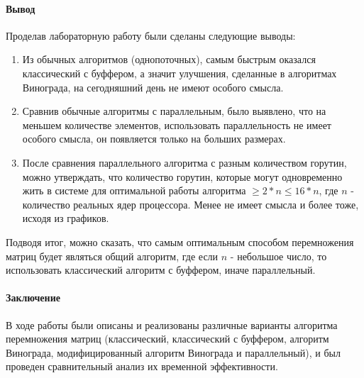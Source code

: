 \documentclass[utf8x, 12pt]{G7-32} %
\begin{document}
\newpage

\paragraph{Вывод}

Проделав лабораторную работу были сделаны следующие выводы:
\begin{enumerate}
	\item Из обычных алгоритмов (однопоточных), самым быстрым оказался классический с буффером, а значит улучшения, сделанные в алгоритмах Винограда, на сегодняшний день не имеют особого смысла.
	\item Сравнив обычные алгоритмы с параллельным, было выявлено, что на меньшем количестве элементов, использовать параллельность не имеет особого смысла, он появляется только на больших размерах.
	\item После сравнения параллельного алгоритма с разным количеством горутин, можно утверждать, что количество горутин, которые могут одновременно жить в системе для оптимальной работы алгоритма $\geq 2*n \leq 16*n$, где $n$ - количество реальных ядер процессора. Менее не имеет смысла и более тоже, исходя из графиков. 
\end{enumerate}
Подводя итог, можно сказать, что самым оптимальным способом перемножения матриц будет являться общий алгоритм, где если $n$ - небольшое число, то использовать классический алгоритм с буффером, иначе параллельный.

\paragraph{Заключение}

В ходе работы были описаны и реализованы различные варианты алгоритма перемножения матриц (классический, классический с буффером, алгоритм Винограда, модифицированный алгоритм Винограда и параллельный), и был проведен сравнительный анализ их временной эффективности.

\backmatter %

\appendix   %
\end{document}
